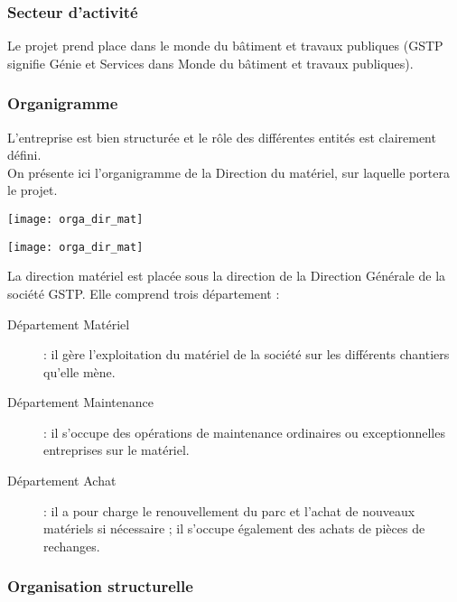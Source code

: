 \documentclass[12pt]{article}
\begin{document}
\subsubsection{Secteur d'activité}
Le projet prend place dans le monde du bâtiment et travaux publiques (GSTP
signifie Génie et Services dans Monde du bâtiment et travaux publiques).


\subsubsection{Organigramme}
L'entreprise est bien structurée et le rôle des différentes entités est clairement défini.\\
On présente ici l'organigramme de la Direction du matériel, sur laquelle
portera le projet.\\

\begin{center}
\texttt{[image: orga\_dir\_mat]}\hfill\\
\end{center}


\begin{center}
\texttt{[image: orga\_dir\_mat]}\hfill\\
\end{center}


La direction matériel est placée sous la direction de la Direction Générale
de la société GSTP. Elle comprend trois département :\\

\begin{description}

\item[Département Matériel] : il gère l'exploitation du matériel de la
société sur les différents chantiers qu'elle mène.
\item[Département Maintenance] : il s'occupe des opérations de maintenance
ordinaires ou exceptionnelles entreprises sur le matériel.
\item[Département Achat] : il a pour charge le renouvellement du parc et
l'achat de nouveaux matériels si nécessaire ; il s'occupe également des
achats de pièces de rechanges.

\end{description}


\subsubsection{Organisation structurelle}
\end{document}
